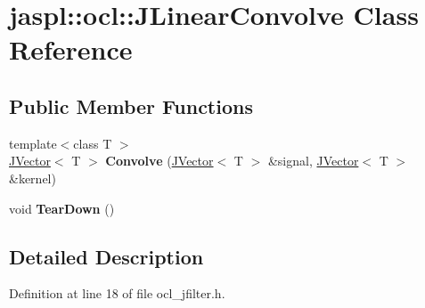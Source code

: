 \hypertarget{classjaspl_1_1ocl_1_1_j_linear_convolve}{}\section{jaspl\+:\+:ocl\+:\+:J\+Linear\+Convolve Class Reference}
\label{classjaspl_1_1ocl_1_1_j_linear_convolve}
\subsection*{Public Member Functions}
\begin{DoxyCompactItemize}
\item 
{\footnotesize template$<$class T $>$ }\\\hyperlink{classjaspl_1_1_j_vector}{J\+Vector}$<$ T $>$ {\bfseries Convolve} (\hyperlink{classjaspl_1_1_j_vector}{J\+Vector}$<$ T $>$ \&signal, \hyperlink{classjaspl_1_1_j_vector}{J\+Vector}$<$ T $>$ \&kernel)\hypertarget{classjaspl_1_1ocl_1_1_j_linear_convolve_a49242f52e8286cdb0844d15b5339fb6a}{}\label{classjaspl_1_1ocl_1_1_j_linear_convolve_a49242f52e8286cdb0844d15b5339fb6a}

\item 
void {\bfseries Tear\+Down} ()\hypertarget{classjaspl_1_1ocl_1_1_j_linear_convolve_a2f83a8cb691b32edfe86b1b97830b3b2}{}\label{classjaspl_1_1ocl_1_1_j_linear_convolve_a2f83a8cb691b32edfe86b1b97830b3b2}

\end{DoxyCompactItemize}


\subsection{Detailed Description}


Definition at line 18 of file ocl\+\_\+jfilter.\+h.

